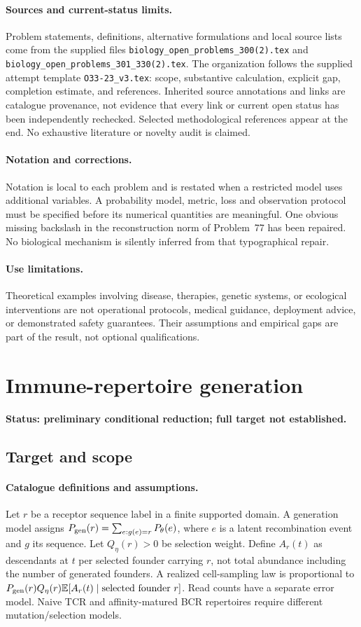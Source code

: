 \documentclass[11pt]{article}
\begin{document}
\paragraph{Sources and current-status limits.}
Problem statements, definitions, alternative formulations and local source lists
come from the supplied files
\texttt{biology\_open\_problems\_300(2).tex} and
\texttt{biology\_open\_problems\_301\_330(2).tex}.
The organization follows the supplied attempt template
\texttt{O33-23\_v3.tex}: scope, substantive calculation, explicit gap,
completion estimate, and references. Inherited source annotations and links are
catalogue provenance, not evidence that every link or current open status has
been independently rechecked. Selected methodological references appear at the
end. No exhaustive literature or novelty audit is claimed.

\paragraph{Notation and corrections.}
Notation is local to each problem and is restated when a restricted model uses
additional variables. A probability model, metric, loss and observation protocol
must be specified before its numerical quantities are meaningful. One obvious
missing backslash in the reconstruction norm of Problem~77 has been repaired.
No biological mechanism is silently inferred from that typographical repair.

\paragraph{Use limitations.}
Theoretical examples involving disease, therapies, genetic systems, or ecological
interventions are not operational protocols, medical guidance, deployment advice,
or demonstrated safety guarantees. Their assumptions and empirical gaps are part
of the result, not optional qualifications.


\section*{Immune-repertoire generation}
\label{prob:232}
\noindent\textbf{Status: preliminary conditional reduction; full target not established.}
\subsection{Target and scope}
\paragraph{Catalogue definitions and assumptions.}
Let $r$ be a receptor sequence label in a finite supported domain. A generation model assigns $P_{\rm gen}(r)=\sum_{e:g(e)=r}P_\theta(e)$, where $e$ is a latent recombination event and $g$ its sequence. Let $Q_\eta(r)>0$ be selection weight. Define $A_r(t)$ as descendants at $t$ per selected founder carrying $r$, not total abundance including the number of generated founders. A realized cell-sampling law is proportional to $P_{\rm gen}(r)Q_\eta(r)\mathbb{E}[A_r(t)\mid\text{selected founder }r]$. Read counts have a separate error model. Naive TCR and affinity-matured BCR repertoires require different mutation/selection models.
\end{document}
